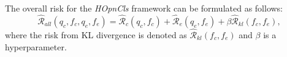 The overall risk for the \textit{HOpnCls} framework can be formulated as follows:
\begin{equation}\nonumber
    \hat{\mathcal{R}}_{all}(q_{c},f_{c},q_{e},f_{e}) = \hat{\mathcal{R}}_{c}(q_{c},f_{c})+\hat{\mathcal{R}}_{e}(q_{e},f_{e})+\beta\hat{\mathcal{R}}_{kl}(f_{c},f_{e}),
\end{equation}
where the risk from KL divergence is denoted as $\hat{\mathcal{R}}_{kl}(f_{c},f_{e})$ and $\beta$ is a hyperparameter.